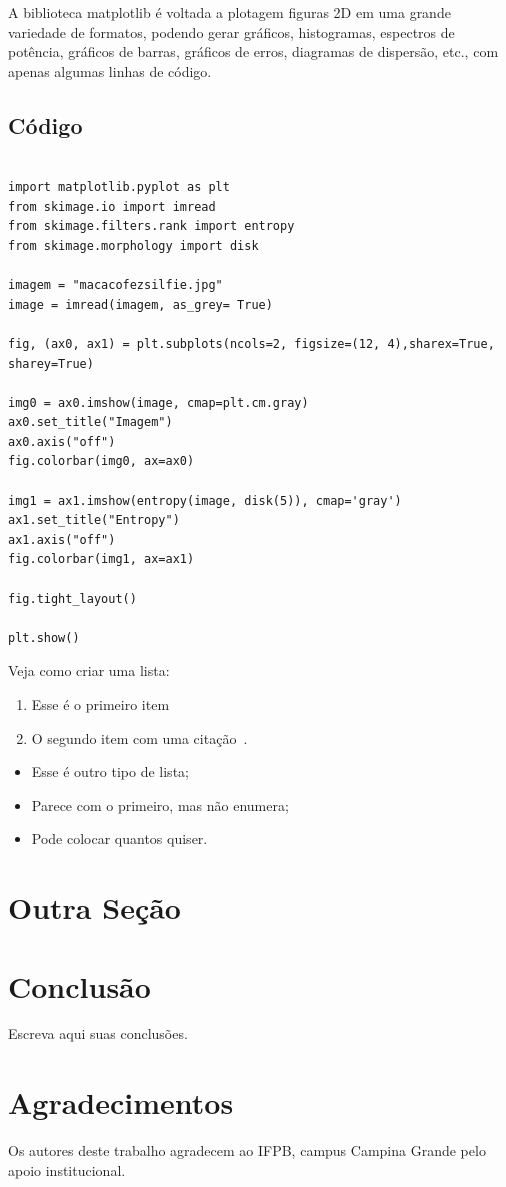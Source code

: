 \documentclass[journal]{IEEEtran}
\begin{document}
A biblioteca matplotlib é voltada a plotagem figuras 2D em uma grande variedade de formatos, podendo gerar gráficos, histogramas, espectros de potência, gráficos de barras, gráficos de erros, diagramas de dispersão, etc., com apenas algumas linhas de código.

\subsection{Código}

 \begin{lstlisting}

import matplotlib.pyplot as plt
from skimage.io import imread
from skimage.filters.rank import entropy
from skimage.morphology import disk

imagem = "macacofezsilfie.jpg" 
image = imread(imagem, as_grey= True) 

fig, (ax0, ax1) = plt.subplots(ncols=2, figsize=(12, 4),sharex=True, sharey=True)

img0 = ax0.imshow(image, cmap=plt.cm.gray)
ax0.set_title("Imagem")
ax0.axis("off")
fig.colorbar(img0, ax=ax0)

img1 = ax1.imshow(entropy(image, disk(5)), cmap='gray')
ax1.set_title("Entropy")
ax1.axis("off")
fig.colorbar(img1, ax=ax1)

fig.tight_layout()

plt.show()

\end{lstlisting}
Veja como criar uma lista:
\begin{enumerate}
    \item Esse é o primeiro item
    \item O segundo item com uma citação~\cite{akyildiz2006next}.
\end{enumerate}


\begin{itemize}
    \item Esse é outro tipo de lista;
    \item Parece com o primeiro, mas não enumera;
    \item Pode colocar quantos quiser.
\end{itemize}


\section{Outra Seção}




\section{Conclusão}
Escreva aqui suas conclusões. \lipsum[1-2]

\section*{Agradecimentos}

Os autores deste trabalho agradecem ao IFPB, campus Campina Grande pelo apoio institucional. 



\end{document}
